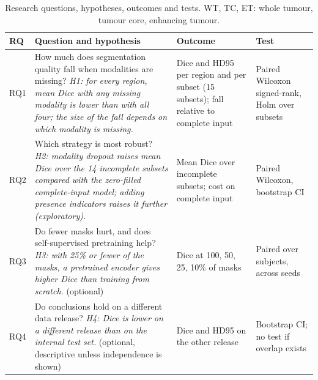 \documentclass[11pt,a4paper]{article}
\begin{document}
\begin{table}[ht]
\centering\small
\caption{Research questions, hypotheses, outcomes and tests. WT, TC, ET: whole tumour, tumour core, enhancing tumour.}
\label{tab:rq}
\begin{tabularx}{\linewidth}{@{}l>{\raggedright\arraybackslash}X>{\raggedright\arraybackslash}X>{\raggedright\arraybackslash}p{2.9cm}@{}}
\toprule
\rowcolor{accentlight}\textbf{RQ} & \textbf{Question and hypothesis} & \textbf{Outcome} & \textbf{Test} \\
\midrule
RQ1 & How much does segmentation quality fall when modalities are missing? \newline \emph{H1: for every region, mean Dice with any missing modality is lower than with all four; the size of the fall depends on which modality is missing.} & Dice and HD95 per region and per subset (15 subsets); fall relative to complete input & Paired Wilcoxon signed-rank, Holm over subsets \\
RQ2 & Which strategy is most robust? \newline \emph{H2: modality dropout raises mean Dice over the 14 incomplete subsets compared with the zero-filled complete-input model; adding presence indicators raises it further (exploratory).} & Mean Dice over incomplete subsets; cost on complete input & Paired Wilcoxon, bootstrap CI \\
RQ3 & Do fewer masks hurt, and does self-supervised pretraining help? \newline \emph{H3: with 25\% or fewer of the masks, a pretrained encoder gives higher Dice than training from scratch.} (optional) & Dice at 100, 50, 25, 10\% of masks & Paired over subjects, across seeds \\
RQ4 & Do conclusions hold on a different data release? \newline \emph{H4: Dice is lower on a different release than on the internal test set.} (optional, descriptive unless independence is shown) & Dice and HD95 on the other release & Bootstrap CI; no test if overlap exists \\
\bottomrule
\end{tabularx}
\end{table}

\end{document}
